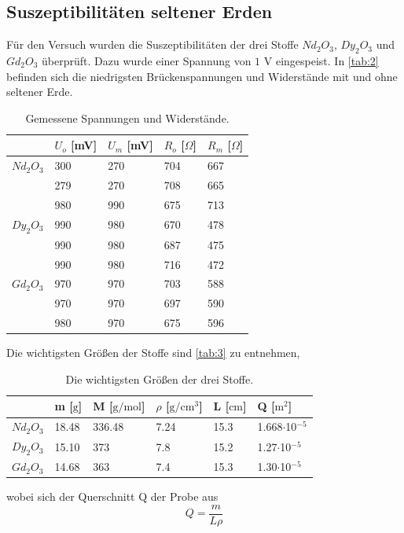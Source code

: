 \subsection{Suszeptibilitäten seltener Erden}
Für den Versuch wurden die Suszeptibilitäten der drei Stoffe $Nd_2 O_3$, $Dy_2 O_3$ und $Gd_2 O_3$ überprüft. Dazu wurde einer Spannung von $1$ V eingespeist. In \autoref{tab:2} befinden sich die niedrigsten Brückenspannungen und Widerstände mit und ohne seltener Erde.
\begin{table}[H]
  \centering
  \caption{Gemessene Spannungen und Widerstände.}
  \begin{tabular}{l|l|l|l|l}
  & $U_{o}$ [mV] & $U_{m}$ [mV] & $R_{o}$ [$\Omega$] & $R_{m}$ [$\Omega$]\\ \hline
  $Nd_2 O_3$ & 300 & 270 & 704 & 667\\
  & 279 & 270 & 708 & 665\\
  & 980 & 990 & 675 & 713\\ \hline
  $Dy_2 O_3$ & 990 & 980 & 670 & 478\\
  & 990 & 980 & 687 & 475\\
  & 990 & 980 & 716 & 472\\ \hline
  $Gd_2 O_3$ & 970 & 970 & 703 & 588\\
  & 970 & 970 & 697 & 590\\
  & 980 & 970 & 675 & 596\\ \hline
  \end{tabular}
  \label{tab:2}
\end{table}
Die wichtigsten Größen der Stoffe sind \autoref{tab:3} zu entnehmen,
\begin{table}[H]
  \centering
  \caption{Die wichtigsten Größen der drei Stoffe.}
  \begin{tabular}{l|l|l|l|l|l}
  & m [$\mathrm{g}$] & M [$\mathrm{g/mol}$] & $\rho$ [$\mathrm{g/cm^3}$] & L [$\mathrm{cm}$] & Q [$\mathrm{m^2}$]\\ \hline
  $Nd_2 O_3$ & 18.48 & 336.48 & 7.24 & 15.3 & 1.668$\cdot$10$^{-5}$ \\ \hline
  $Dy_2 O_3$ & 15.10 & 373 & 7.8 & 15.2 & 1.27$\cdot$10$^{-5}$ \\ \hline
  $Gd_2 O_3$ & 14.68 & 363 & 7.4 & 15.3 & 1.30$\cdot$10$^{-5}$ \\ \hline
  \end{tabular}
  \label{tab:3}
\end{table}
wobei sich der Querschnitt Q der Probe aus 
\begin{equation*}
  Q=\frac{m}{L\rho}
\end{equation*}
